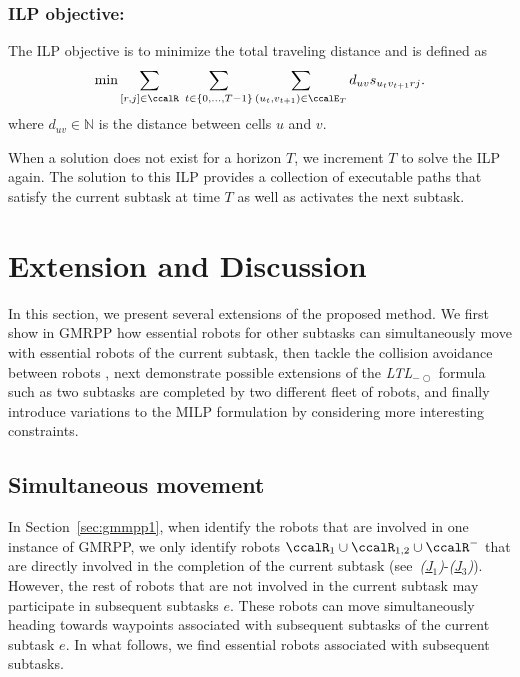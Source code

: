 \documentclass[Afour,sageh,times]{sagej}
\newcommand{\ltl}{ {\it LTL}$_{-\bigcirc}$ }
\begin{document}
{\subsubsection{ILP objective:} The ILP objective is to minimize the total traveling distance and is defined as
\begingroup\makeatletter\def\f@size{10}\check@mathfonts
\def\maketag@@@#1{\hbox{\m@th\normalsize\normalfont#1}}%
\begingroup
\begin{align}
  \text{min} \sum_{[r,j] \in \ccalR} \; \sum_{t\in \{0,\ldots, T-1\}} \sum_{(u_t, v_{t+1}) \in \ccalE_T} d_{uv} s_{u_{t} v_{t+1} r j}   .
\end{align}
\endgroup
where $d_{uv} \in \mathbb{N}$ is the distance between cells $u$ and $v$.

When a solution does not exist for a horizon $T$, we increment $T$ to solve the ILP again.  The solution to this ILP provides  a collection of executable paths that satisfy  the current subtask at time $T$  as well as activates the next subtask.

\section{Extension and Discussion}\label{sec:extension}
In this section, we present several extensions of the proposed method. We first show in GMRPP  how essential robots for other subtasks  can simultaneously move with essential robots of the current subtask, then  tackle the collision avoidance between robots ,  next demonstrate possible extensions of the \ltl formula such as two subtasks are completed by two different fleet of robots, and finally introduce variations to the MILP formulation by considering more interesting constraints.


\subsection{Simultaneous movement}\label{sec:extension_essential}
In Section~\ref{sec:gmmpp1}, when identify the robots that are involved in one instance of GMRPP, we only identify robots $\ccalR_1 \cup \ccalR_{1,2} \cup \ccalR^-$ that are directly involved in the completion of the current subtask (see~{\it (\hyperref[sec:essential_a]{J$_1$})}-{\it (\hyperref[sec:essential_c]{J$_3$})}). However, the rest of robots that are not involved in the current subtask may participate in subsequent subtasks $e$. These robots can move simultaneously  heading towards  waypoints associated with subsequent subtasks of the current subtask $e$. In what follows, we find essential robots associated with subsequent subtasks.

}
\end{document}
